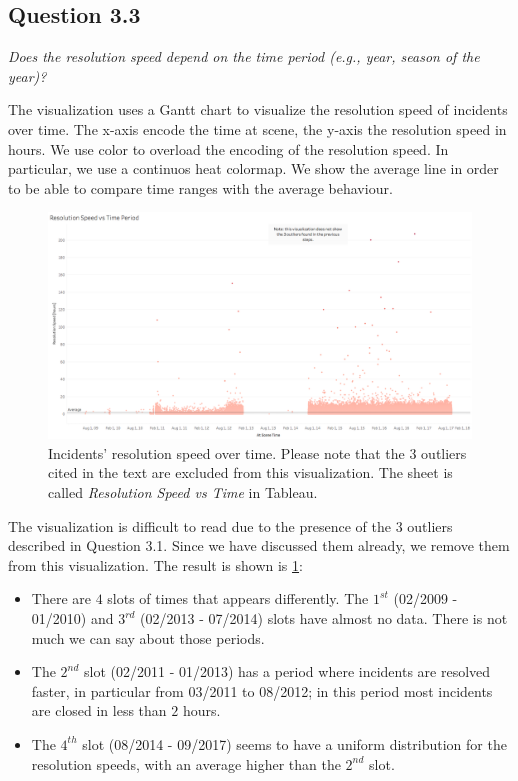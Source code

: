 \subsection*{Question 3.3}
\textit{Does the resolution speed depend on the time period (e.g., year, season of the year)?}

The visualization uses a Gantt chart to visualize the resolution speed of incidents over time.
The x-axis encode the time at scene, the y-axis the resolution speed in hours.
We use color to overload the encoding of the resolution speed.
In particular, we use a continuos heat colormap.
We show the average line in order to be able to compare time ranges with the average behaviour.

\begin{figure}[h]
	\centering
	\includegraphics[width=\columnwidth]{figures/3_3_resolution_speed_vs_time}
	\caption{Incidents' resolution speed over time. Please note that the $3$ outliers cited in the text are excluded from this visualization. The sheet is called \textit{Resolution Speed vs Time} in Tableau.}
	\label{fig:3_3_resolution_speed_vs_time}
\end{figure}

The visualization is difficult to read due to the presence of the $3$ outliers described in Question 3.1.
Since we have discussed them already, we remove them from this visualization.
The result is shown is \cref{fig:3_3_resolution_speed_vs_time}:
\begin{itemize}
    \item There are $4$ slots of times that appears differently. The $1^{st}$ (02/2009 - 01/2010) and $3^{rd}$ (02/2013 - 07/2014) slots have almost no data. There is not much we can say about those periods.
    \item The $2^{nd}$ slot (02/2011 - 01/2013) has a period where incidents are resolved faster, in particular from 03/2011 to 08/2012; in this period most incidents are closed in less than $2$ hours.
    \item The $4^{th}$ slot (08/2014 - 09/2017) seems to have a uniform distribution for the resolution speeds, with an average higher than the $2^{nd}$ slot.
\end{itemize}

